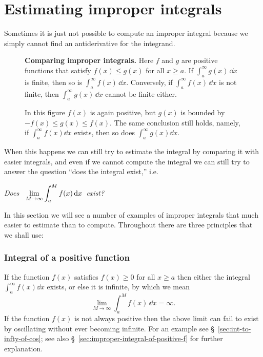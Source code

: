 \section{Estimating improper integrals} %
Sometimes it is just not possible to compute an improper integral
because we simply cannot find an antiderivative for the integrand.
\begin{figure}[t]
  \centering 
  \label{fig:02improper-integral-comparison}
  \caption{\textbf{Comparing improper integrals.  } Here $f$ and $g$ are
  positive functions that satisfy $f(x)\leq g(x)$ for all $x\geq a$.  If
  $\int_a^\infty g(x)\,\dd x$ is finite, then so is $\int_a^\infty f(x)\,\dd x$.
  Conversely, if $\int_a^\infty f(x)\,\dd x$ is not finite, then $\int_a^\infty
  g(x)\,\dd x$ cannot be finite either.}

  \bigskip
  
  
  \caption{ In this figure $f(x)$ is again positive, but $g(x)$ is bounded by
  $-f(x)\leq g(x)\leq f(x)$.  The same conclusion still holds, namely, if
  $\int_a^\infty f(x)\dd x$ exists, then so does $\int_a^\infty g(x)\dd x$.}
\end{figure}
When this happens we can still try to estimate the integral by comparing it with
easier integrals, and even if we cannot compute the integral we can still try to
answer the question ``does the integral exist,'' i.e.
\begin{center}
  \itshape Does \ $\displaystyle\lim_{M\to \infty}\int _a^M f(x)\, \mathrm{d} x$\
  exist?
\end{center}
In this section we will see a number of examples of improper integrals that much
easier to estimate than to compute.  Throughout there are three principles that
we shall use:

\subsubsection*{Integral of a positive function} If the function $f(x)$
satisfies $f(x)\geq 0$ for all $x\geq a$ then either the integral $\int_a^\infty
f(x) \dd x$ exists, or else it is infinite, by which we mean
\[
\lim_{M\to\infty} \int_a^M f(x)\,\dd x = \infty.
\]
If the function $f(x)$ is not always positive then the above limit can fail to
exist by oscillating without ever becoming infinite.  For an example see
\S~\ref{sec:int-to-infty-of-cos}; see also
\S~\ref{sec:improper-integral-of-positive-f} for further explanation.

